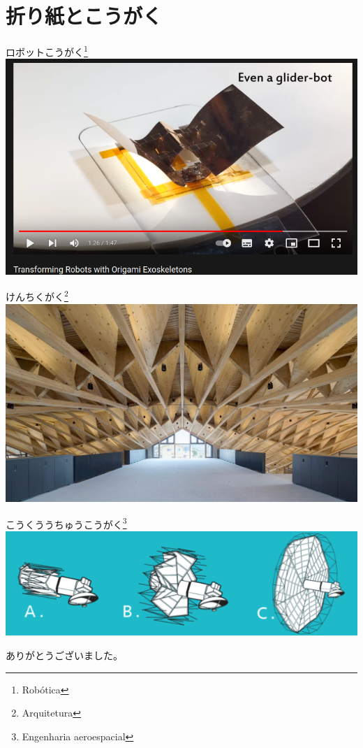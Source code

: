 \documentclass{beamer}
\begin{document}
\section{折り紙とこうがく}
\begin{frame}{ロボットこうがく\footnote{Robótica}}
		\includegraphics[width=1\textwidth]{bb.png}
	
\end{frame}
\begin{frame}{けんちくがく\footnote{Arquitetura}}
	\includegraphics[width=1\textwidth]{b.jpg}
\end{frame}
\begin{frame}{こうくううちゅうこうがく\footnote{Engenharia aeroespacial}}
	\includegraphics[width=1\textwidth]{c.png}
\end{frame}
\begin{frame}
	\Huge
	\center
	ありがとうございました。
\end{frame}
\end{document}
